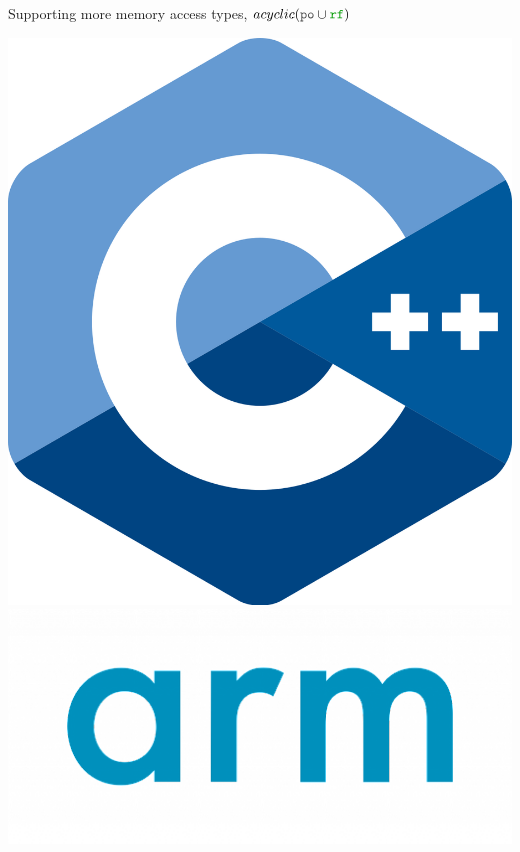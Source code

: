 \begin{frame}{Supporting more memory access types, \sout{$acyclic(\lPO \cup \lRF)$}}


      
            
    

  \begin{center}
    \hfill
    \includegraphics[width=0.15\linewidth]{cpp.png} \hfill
    \includegraphics[width=0.3\linewidth]{arm.png} \hfill
     \hfill
  \end{center}


\end{frame}
